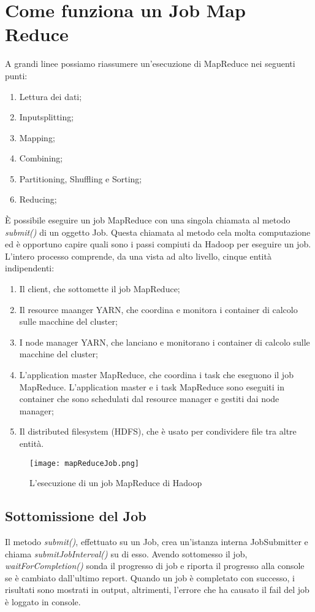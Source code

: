 \section{Come funziona un Job Map Reduce}
A grandi linee possiamo riassumere un'esecuzione di MapReduce nei seguenti punti:
\begin{enumerate}
  \item Lettura dei dati;
  \item Inputsplitting;
  \item Mapping;
  \item Combining; 
  \item Partitioning, Shuffling e Sorting;
  \item Reducing;
\end{enumerate}
È possibile eseguire un job MapReduce con una singola chiamata al metodo \textit{submit()} di un oggetto Job. Questa chiamata al metodo cela molta computazione ed è opportuno capire quali sono i passi compiuti da Hadoop  per eseguire un job. L'intero processo comprende, da una vista ad alto livello, cinque entità indipendenti:
\begin{enumerate}
  \item Il client, che sottomette il job MapReduce;
  \item Il resource maanger YARN, che coordina e monitora i container di calcolo sulle macchine del cluster;
  \item I node manager YARN, che lanciano e monitorano i container di calcolo sulle macchine del cluster;
  \item L'application master MapReduce, che coordina i task che eseguono il job MapReduce. L'application master e i task MapReduce sono eseguiti in container che sono schedulati dal resource manager e gestiti dai node manager;
  \item Il distributed filesystem (HDFS), che è usato per condividere file tra altre entità.
\end{enumerate}
\begin{figure}
  \begin{center}
    \texttt{[image: mapReduceJob.png]}
    \caption{L'esecuzione di un job MapReduce di Hadoop}
    \label{fig:job}
  \end{center}
\end{figure}
\subsection{Sottomissione del Job}
Il metodo \textit{submit()}, effettuato su un Job, crea un'istanza interna JobSubmitter e chiama \textit{submitJobInterval()} su di esso. Avendo sottomesso il job, \textit{waitForCompletion()} sonda il progresso di job e riporta il progresso alla console se è cambiato dall'ultimo report. Quando un job è completato con successo, i risultati sono mostrati in output, altrimenti, l'errore che ha causato il fail del job è loggato in console.
